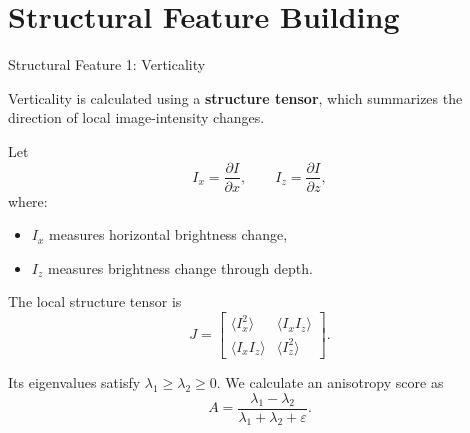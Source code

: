 \documentclass[aspectratio=169]{beamer}
\begin{document}

\section{Structural Feature Building}

\begin{frame}{Structural Feature 1: Verticality}

Verticality is calculated using a \textbf{structure tensor}, which summarizes
the direction of local image-intensity changes.

Let
\[
I_x=\frac{\partial I}{\partial x},
\qquad
I_z=\frac{\partial I}{\partial z},
\]
where:
\begin{itemize}
    \item \(I_x\) measures horizontal brightness change,
    \item \(I_z\) measures brightness change through depth.
\end{itemize}
The local structure tensor is
\[
J
=
\begin{bmatrix}
\langle I_x^2\rangle & \langle I_xI_z\rangle \\
\langle I_xI_z\rangle & \langle I_z^2\rangle
\end{bmatrix}.
\]

Its eigenvalues satisfy $\lambda_1\geq \lambda_2\geq 0$. We calculate an anisotropy score as
\[
A
=
\frac{
\lambda_1-\lambda_2
}{
\lambda_1+\lambda_2+\varepsilon
}.
\]
\end{frame}
\end{document}
